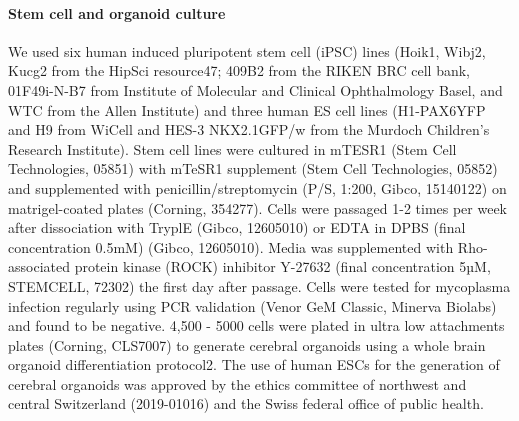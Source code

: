  
\paragraph{Stem cell and organoid culture}
We used six human induced pluripotent stem cell (iPSC) lines (Hoik1, Wibj2, Kucg2 from the HipSci resource47; 409B2 from the RIKEN BRC cell bank, 01F49i-N-B7 from Institute of Molecular and Clinical Ophthalmology Basel, and WTC from the Allen Institute) and three human ES cell lines (H1-PAX6YFP and H9 from WiCell and HES-3 NKX2.1GFP/w from the Murdoch Children's Research Institute). Stem cell lines were cultured in mTESR1 (Stem Cell Technologies, 05851) with mTeSR1 supplement (Stem Cell Technologies, 05852) and supplemented with penicillin/streptomycin (P/S, 1:200, Gibco, 15140122) on matrigel-coated plates (Corning, 354277). Cells were passaged 1-2 times per week after dissociation with TryplE (Gibco, 12605010) or EDTA in DPBS (final concentration 0.5mM) (Gibco, 12605010). Media was supplemented with Rho-associated protein kinase (ROCK) inhibitor Y-27632 (final concentration 5µM, STEMCELL, 72302) the first day after passage. Cells were tested for mycoplasma infection regularly using PCR validation (Venor GeM Classic, Minerva Biolabs) and found to be negative. 4,500 - 5000 cells were plated in ultra low attachments plates (Corning, CLS7007) to generate cerebral organoids using a whole brain organoid differentiation protocol2. The use of human ESCs for the generation of cerebral organoids was approved by the ethics committee of northwest and central Switzerland (2019-01016) and the Swiss federal office of public health.

